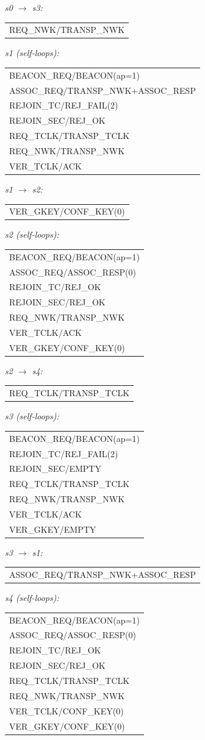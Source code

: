 \documentclass[10pt]{article}
\makeatletter
\newcommand{\iolist}[1]{%
  \ttfamily\small
  \begin{tabular}{@{}l@{}}
  #1
  \end{tabular}%
  \rmfamily
}
\makeatother
\begin{document}
\medskip
\noindent\textit{s0 $\to$ s3:}\\[2pt]
\iolist{%
REQ\_NWK/TRANSP\_NWK\\
}

\medskip
\noindent\textit{s1 (self-loops):}\\[2pt]
\iolist{%
BEACON\_REQ/BEACON(ap=1)\\
ASSOC\_REQ/TRANSP\_NWK+ASSOC\_RESP\\
REJOIN\_TC/REJ\_FAIL(2)\\
REJOIN\_SEC/REJ\_OK\\
REQ\_TCLK/TRANSP\_TCLK\\
REQ\_NWK/TRANSP\_NWK\\
VER\_TCLK/ACK\\
}

\medskip
\noindent\textit{s1 $\to$ s2:}\\[2pt]
\iolist{%
VER\_GKEY/CONF\_KEY(0)\\
}

\medskip
\noindent\textit{s2 (self-loops):}\\[2pt]
\iolist{%
BEACON\_REQ/BEACON(ap=1)\\
ASSOC\_REQ/ASSOC\_RESP(0)\\
REJOIN\_TC/REJ\_OK\\
REJOIN\_SEC/REJ\_OK\\
REQ\_NWK/TRANSP\_NWK\\
VER\_TCLK/ACK\\
VER\_GKEY/CONF\_KEY(0)\\
}

\medskip
\noindent\textit{s2 $\to$ s4:}\\[2pt]
\iolist{%
REQ\_TCLK/TRANSP\_TCLK\\
}

\medskip
\noindent\textit{s3 (self-loops):}\\[2pt]
\iolist{%
BEACON\_REQ/BEACON(ap=1)\\
REJOIN\_TC/REJ\_FAIL(2)\\
REJOIN\_SEC/EMPTY\\
REQ\_TCLK/TRANSP\_TCLK\\
REQ\_NWK/TRANSP\_NWK\\
VER\_TCLK/ACK\\
VER\_GKEY/EMPTY\\
}

\medskip
\noindent\textit{s3 $\to$ s1:}\\[2pt]
\iolist{%
ASSOC\_REQ/TRANSP\_NWK+ASSOC\_RESP\\
}

\medskip
\noindent\textit{s4 (self-loops):}\\[2pt]
\iolist{%
BEACON\_REQ/BEACON(ap=1)\\
ASSOC\_REQ/ASSOC\_RESP(0)\\
REJOIN\_TC/REJ\_OK\\
REJOIN\_SEC/REJ\_OK\\
REQ\_TCLK/TRANSP\_TCLK\\
REQ\_NWK/TRANSP\_NWK\\
VER\_TCLK/CONF\_KEY(0)\\
VER\_GKEY/CONF\_KEY(0)\\
}
\end{document}
